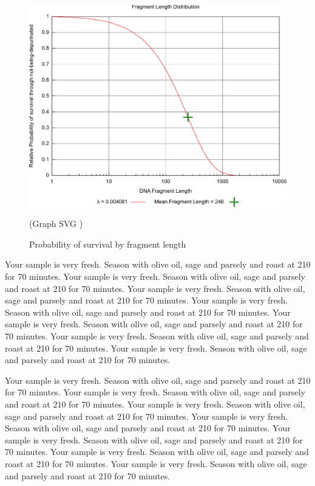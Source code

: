\documentclass[11pt,a4paper]{report}
\begin{document}
\begin{figure}
 \centering
 \includegraphics[width=12cm]{lambdas_fragment_lengths_98.pdf}
 \caption{Probability of survival by fragment length}
 (Graph SVG )
 \label{fig:summ_p_graph}
\end{figure}

Your sample is very fresh. Season with olive oil, sage and parsely and roast at 210 for 70 minutes. Your sample is very fresh. Season with olive oil, sage and parsely and roast at 210 for 70 minutes. Your sample is very fresh. Season with olive oil, sage and parsely and roast at 210 for 70 minutes. Your sample is very fresh. Season with olive oil, sage and parsely and roast at 210 for 70 minutes. Your sample is very fresh. Season with olive oil, sage and parsely and roast at 210 for 70 minutes. Your sample is very fresh. Season with olive oil, sage and parsely and roast at 210 for 70 minutes. Your sample is very fresh. Season with olive oil, sage and parsely and roast at 210 for 70 minutes.

Your sample is very fresh. Season with olive oil, sage and parsely and roast at 210 for 70 minutes. Your sample is very fresh. Season with olive oil, sage and parsely and roast at 210 for 70 minutes. Your sample is very fresh. Season with olive oil, sage and parsely and roast at 210 for 70 minutes. Your sample is very fresh. Season with olive oil, sage and parsely and roast at 210 for 70 minutes. Your sample is very fresh. Season with olive oil, sage and parsely and roast at 210 for 70 minutes. Your sample is very fresh. Season with olive oil, sage and parsely and roast at 210 for 70 minutes. Your sample is very fresh. Season with olive oil, sage and parsely and roast at 210 for 70 minutes.
\end{document}
